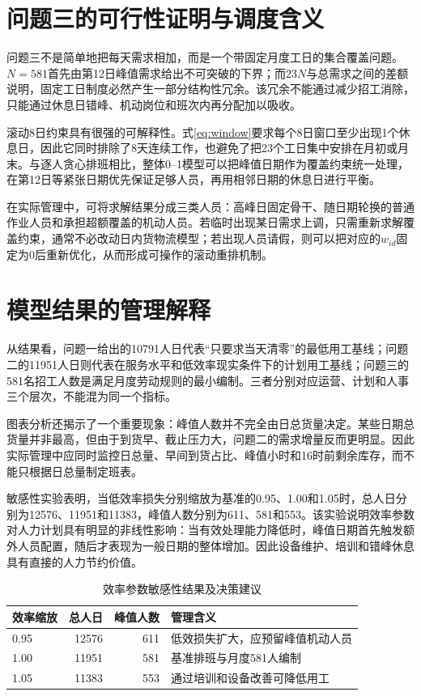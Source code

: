 \section{问题三的可行性证明与调度含义}

问题三不是简单地把每天需求相加，而是一个带固定月度工日的集合覆盖问题。$N=581$首先由第12日峰值需求给出不可突破的下界；而$23N$与总需求之间的差额说明，固定工日制度必然产生一部分结构性冗余。该冗余不能通过减少招工消除，只能通过休息日错峰、机动岗位和班次内再分配加以吸收。

滚动8日约束具有很强的可解释性。式\eqref{eq:window}要求每个8日窗口至少出现1个休息日，因此它同时排除了8天连续工作，也避免了把23个工日集中安排在月初或月末。与逐人贪心排班相比，整体0--1模型可以把峰值日期作为覆盖约束统一处理，在第12日等紧张日期优先保证足够人员，再用相邻日期的休息日进行平衡。

在实际管理中，可将求解结果分成三类人员：高峰日固定骨干、随日期轮换的普通作业人员和承担超额覆盖的机动人员。若临时出现某日需求上调，只需重新求解覆盖约束，通常不必改动日内货物流模型；若出现人员请假，则可以把对应的$w_{id}$固定为0后重新优化，从而形成可操作的滚动重排机制。

\section{模型结果的管理解释}

从结果看，问题一给出的10791人日代表“只要求当天清零”的最低用工基线；问题二的11951人日则代表在服务水平和低效率现实条件下的计划用工基线；问题三的581名招工人数是满足月度劳动规则的最小编制。三者分别对应运营、计划和人事三个层次，不能混为同一个指标。

图表分析还揭示了一个重要现象：峰值人数并不完全由日总货量决定。某些日期总货量并非最高，但由于到货早、截止压力大，问题二的需求增量反而更明显。因此实际管理中应同时监控日总量、早间到货占比、峰值小时和16时前剩余库存，而不能只根据日总量制定班表。

敏感性实验表明，当低效率损失分别缩放为基准的0.95、1.00和1.05时，总人日分别为12576、11951和11383，峰值人数分别为611、581和553。该实验说明效率参数对人力计划具有明显的非线性影响：当有效处理能力降低时，峰值日期首先触发额外人员配置，随后才表现为一般日期的整体增加。因此设备维护、培训和错峰休息具有直接的人力节约价值。

\begin{table}[htbp]
\centering
\caption{效率参数敏感性结果及决策建议}
\label{tab:sensitivity2}
\begin{tabular}{lrrp{}}
\toprule
效率缩放 & 总人日 & 峰值人数 & 管理含义\\
\midrule
0.95 & 12576 & 611 & 低效损失扩大，应预留峰值机动人员\\
1.00 & 11951 & 581 & 基准排班与月度581人编制\\
1.05 & 11383 & 553 & 通过培训和设备改善可降低用工\\
\bottomrule
\end{tabular}
\end{table}
